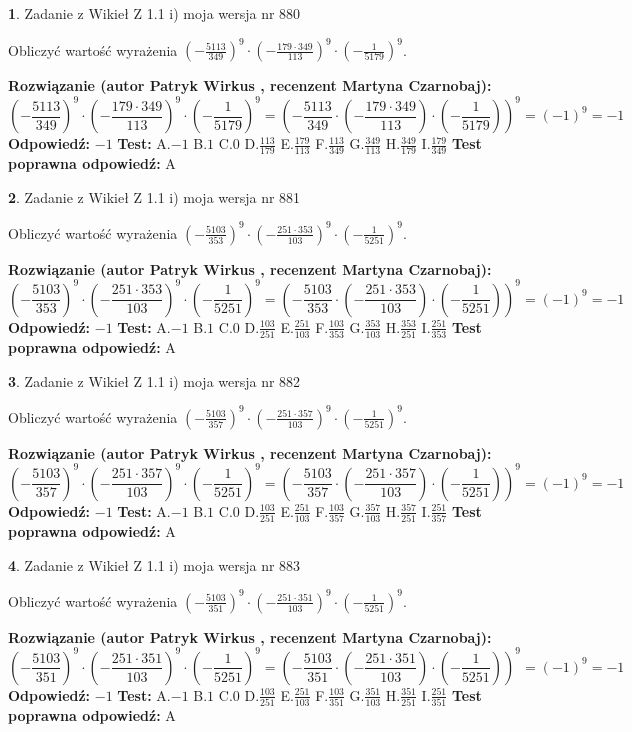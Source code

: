 \documentclass[12pt, a4paper]{article}
\theoremstyle{definition} %
\newtheorem{zad}{}
\newcommand{\zadStart}[1]{\begin{zad}#1\newline}
\newcommand{\zadStop}{\end{zad}}
\newcommand{\rozwStart}[2]{\noindent \textbf{Rozwiązanie (autor #1 , recenzent #2): }\newline}
\newcommand{\rozwStop}{\newline}
\newcommand{\odpStart}{\noindent \textbf{Odpowiedź:}\newline}
\newcommand{\odpStop}{\newline}
\newcommand{\testStart}{\noindent \textbf{Test:}\newline}
\newcommand{\testStop}{\newline}
\newcommand{\kluczStart}{\noindent \textbf{Test poprawna odpowiedź:}\newline}
\newcommand{\kluczStop}{\newline}
\begin{document}
\zadStart{Zadanie z Wikieł Z 1.1 i) moja wersja nr 880}

Obliczyć wartość wyrażenia $(-\frac{5113}{349})^{9} \cdot (-\frac{179 \cdot 349}{113})^{9} \cdot (-\frac{1}{5179})^{9}$.
\zadStop
\rozwStart{Patryk Wirkus}{Martyna Czarnobaj}
$$(-\frac{5113}{349})^{9} \cdot (-\frac{179 \cdot 349}{113})^{9} \cdot (-\frac{1}{5179})^{9} = (-\frac{5113}{349} \cdot (-\frac{179 \cdot 349}{113}) \cdot (-\frac{1}{5179}))^{9} = (-1)^{9} = -1$$
\rozwStop
\odpStart
$-1$
\odpStop
\testStart
A.$-1$ B.$1$ C.$0$ D.$\frac{113}{179}$ E.$\frac{179}{113}$
F.$\frac{113}{349}$ G.$\frac{349}{113}$
H.$\frac{349}{179}$
I.$\frac{179}{349}$
\testStop
\kluczStart
A
\kluczStop



\zadStart{Zadanie z Wikieł Z 1.1 i) moja wersja nr 881}

Obliczyć wartość wyrażenia $(-\frac{5103}{353})^{9} \cdot (-\frac{251 \cdot 353}{103})^{9} \cdot (-\frac{1}{5251})^{9}$.
\zadStop
\rozwStart{Patryk Wirkus}{Martyna Czarnobaj}
$$(-\frac{5103}{353})^{9} \cdot (-\frac{251 \cdot 353}{103})^{9} \cdot (-\frac{1}{5251})^{9} = (-\frac{5103}{353} \cdot (-\frac{251 \cdot 353}{103}) \cdot (-\frac{1}{5251}))^{9} = (-1)^{9} = -1$$
\rozwStop
\odpStart
$-1$
\odpStop
\testStart
A.$-1$ B.$1$ C.$0$ D.$\frac{103}{251}$ E.$\frac{251}{103}$
F.$\frac{103}{353}$ G.$\frac{353}{103}$
H.$\frac{353}{251}$
I.$\frac{251}{353}$
\testStop
\kluczStart
A
\kluczStop



\zadStart{Zadanie z Wikieł Z 1.1 i) moja wersja nr 882}

Obliczyć wartość wyrażenia $(-\frac{5103}{357})^{9} \cdot (-\frac{251 \cdot 357}{103})^{9} \cdot (-\frac{1}{5251})^{9}$.
\zadStop
\rozwStart{Patryk Wirkus}{Martyna Czarnobaj}
$$(-\frac{5103}{357})^{9} \cdot (-\frac{251 \cdot 357}{103})^{9} \cdot (-\frac{1}{5251})^{9} = (-\frac{5103}{357} \cdot (-\frac{251 \cdot 357}{103}) \cdot (-\frac{1}{5251}))^{9} = (-1)^{9} = -1$$
\rozwStop
\odpStart
$-1$
\odpStop
\testStart
A.$-1$ B.$1$ C.$0$ D.$\frac{103}{251}$ E.$\frac{251}{103}$
F.$\frac{103}{357}$ G.$\frac{357}{103}$
H.$\frac{357}{251}$
I.$\frac{251}{357}$
\testStop
\kluczStart
A
\kluczStop



\zadStart{Zadanie z Wikieł Z 1.1 i) moja wersja nr 883}

Obliczyć wartość wyrażenia $(-\frac{5103}{351})^{9} \cdot (-\frac{251 \cdot 351}{103})^{9} \cdot (-\frac{1}{5251})^{9}$.
\zadStop
\rozwStart{Patryk Wirkus}{Martyna Czarnobaj}
$$(-\frac{5103}{351})^{9} \cdot (-\frac{251 \cdot 351}{103})^{9} \cdot (-\frac{1}{5251})^{9} = (-\frac{5103}{351} \cdot (-\frac{251 \cdot 351}{103}) \cdot (-\frac{1}{5251}))^{9} = (-1)^{9} = -1$$
\rozwStop
\odpStart
$-1$
\odpStop
\testStart
A.$-1$ B.$1$ C.$0$ D.$\frac{103}{251}$ E.$\frac{251}{103}$
F.$\frac{103}{351}$ G.$\frac{351}{103}$
H.$\frac{351}{251}$
I.$\frac{251}{351}$
\testStop
\kluczStart
A
\kluczStop
\end{document}
